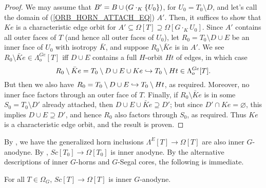 \documentclass[a4paper,10pt,draft]{article}%
\numberwithin{equation}{section}%
\begin{document}
\begin{proof}
      We may assume that $B' = B \cup (G\cdot_K \left\{U_0\right\})$, for $U_0 = T_0 \setminus D$,
      and let's call the domain of (\ref{ORB_HORN_ATTACH_EQ}) $A'$.
      Then, it suffices to show that $K e$ is a characteristic edge orbit for
      $A' \subseteq \Omega[T] \supseteq \Omega[G \cdot_K U_0]$.
      Since $A'$ contains all outer faces of $T$ (and hence all outer faces of $U_0$),
      let $R_0 = T_0 \setminus D \cup E$ be an inner face of $U_0$ with isotropy $\bar K$, and suppose
      $R_0 \setminus \bar K e$ is in $A'$.
      We see $R_0 \setminus \bar K e \in \Lambda^{G e}_o[T]$ iff $D \cup E$ contains a full $H$-orbit $H t$ of edges, in which case
      \begin{equation}
            R_0 \setminus \bar K e = T_0 \setminus D \cup E \cup K e
            \hookrightarrow
            T_0 \setminus H t \in \Lambda^{G e}_o[T].
      \end{equation}
      But then we also have $R_0 = T_0 \setminus D \cup E \hookrightarrow T_0 \setminus H t$, as required.
      Moreover, no inner face factors through an outer face of $T$.
      Finally, if $R_0 \setminus \bar K e$ is in some $S_0 = T_0 \setminus D'$ already attached, then
      $D \cup E \cup \bar K e \supseteq D'$;
      but since $D' \cap K e = \varnothing$, this implies
      $D \cup E \supseteq D'$, and hence $R_0$ also factors through $S_0$, as required.
      Thus $K e$ is a characteristic edge orbit, and the result is proven.
\end{proof}




By \cite[6.17]{Per17}, we have the generalized horn inclusions
$\Lambda^E[T] \to \Omega[T]$ are also inner $G$-anodyne.
By \cite[2.4]{CM13a}, $Sc[T_0] \to \Omega[T_0]$ is inner anodyne.
By the alternative descriptions of inner $G$-horns and $G$-Segal cores, the following is immediate.
\begin{lemma}
      \label{SC_IN_GHORN_LEM}
      For all $T \in \Omega_G$, $Sc[T] \to \Omega[T]$ is inner $G$-anodyne.
\end{lemma}
\end{document}
